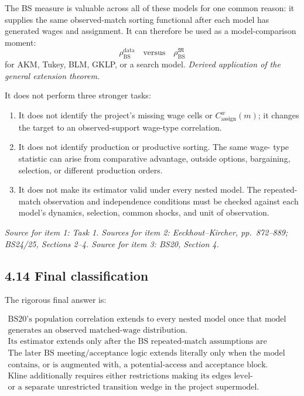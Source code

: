 \documentclass[11pt]{article}
\begin{document}
The BS measure is valuable across all of these models for one common reason:
it supplies the same observed-match sorting functional after each model has
generated wages and assignment.  It can therefore be used as a
model-comparison moment:
\[
\rho_{\mathrm{BS}}^{\mathrm{data}}
\quad\text{versus}\quad
\rho_{\mathrm{BS}}^{\mathfrak M}
\tag{T4.63}
\]
for AKM, Tukey, BLM, GKLP, or a search model.
\textit{Derived application of the general extension theorem.}

It does not perform three stronger tasks:

\begin{enumerate}
\item It does not identify the project's missing wage cells or
  \(C^w_{\mathrm{assign}}(m)\); it changes the target to an observed-support
  wage-type correlation.
\item It does not identify production or productive sorting.  The same wage-
  type statistic can arise from comparative advantage, outside options,
  bargaining, selection, or different production orders.
\item It does not make its estimator valid under every nested model.  The
  repeated-match observation and independence conditions must be checked
  against each model's dynamics, selection, common shocks, and unit of
  observation.
\end{enumerate}

\textit{Source for item 1: Task 1.  Sources for item 2:
Eeckhout--Kircher, pp.\ 872--889; BS24/25, Sections 2--4.  Source for item 3:
BS20, Section 4.}

\subsection{4.14 Final classification}

The rigorous final answer is:

\[
\boxed{
\begin{array}{c}
\text{BS20's population correlation extends to every nested model once that
model}\\
\text{generates an observed matched-wage distribution.}\\[0.3em]
\text{Its estimator extends only after the BS repeated-match assumptions are
verified.}\\[0.3em]
\text{The later BS meeting/acceptance logic extends literally only when the
model}\\
\text{contains, or is augmented with, a potential-access and acceptance
block.}\\[0.3em]
\text{Kline additionally requires either restrictions making its edges
level-rationalizable}\\
\text{or a separate unrestricted transition wedge in the project
supermodel.}
\end{array}}
\tag{T4.64}
\]
\end{document}
